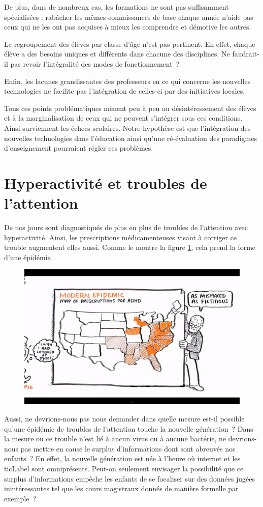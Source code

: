 De plus, dans de nombreux cas, les formations ne sont pas suffisamment spécialisées : rabâcher les mêmes connaissances de base chaque année n'aide pas ceux qui ne les ont pas acquises à mieux les comprendre et démotive les autres.

Le regroupement des élèves par classe d'âge n'est pas pertinent. En effet, chaque élève a des besoins uniques et différents dans chacune des disciplines. Ne faudrait-il pas revoir l'intégralité des modes de fonctionnement~?

Enfin, les lacunes grandissantes des professeurs en ce qui concerne les nouvelles technologies ne facilite pas l'intégration de celles-ci par des initiatives locales.

Tous ces points problématiques mènent peu à peu au désintéressement des élèves et à la marginalisation de ceux qui ne peuvent s'intégrer sous ces conditions. Ainsi surviennent les échecs scolaires. Notre hypothèse est que l'intégration des nouvelles technologies dans l'éducation ainsi qu'une ré-évaluation des paradigmes d'enseignement pourraient régler ces problèmes.

\section{Hyperactivité et troubles de l'attention}
De nos jours sont diagnostiqués de plus en plus de troubles de l'attention avec hyperactivité. Ainsi, les prescriptions médicamenteuses visant à corriger ce trouble augmentent elles aussi. Comme le montre la figure \ref{adhd_map}, cela prend la forme d'une épidémie \cite{robinson2010paradigms}.
\begin{figure}[h]
\includegraphics[trim=1.9cm 1.5cm 0cm 1.5cm, clip=true, width=\linewidth]{../resources/illustrations/ADHD}
\label{adhd_map}
\end{figure}
Aussi, ne devrions-nous pas nous demander dans quelle mesure est-il
possible qu'une épidémie de troubles de l'attention touche la nouvelle
génération~? Dans la mesure ou ce trouble n'est lié à aucun virus ou à
aucune bactérie, ne devrions-nous pas mettre en cause le surplus
d'informations dont sont abreuvés nos enfants~? En effet, la nouvelle
génération est née à l'heure où internet et les \gls{ticLabel} sont
omniprésents. Peut-on seulement envisager la possibilité que ce
surplus d'informations empêche les enfants de se focaliser sur des
données jugées inintéressantes tel que les cours magistraux donnés de manière formelle par exemple~?

